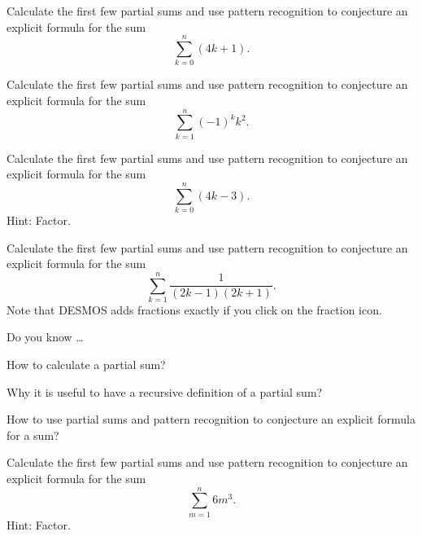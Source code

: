 \begin{exer}[\exerU] %
\label{exer_sum_conj_4kplus1}
    Calculate the first few partial sums and use pattern recognition to conjecture an explicit formula for the sum 
        $$\displaystyle \sum_{k=0}^n(4k+1).$$
    
\end{exer}

\begin{exer}[\exerU] %
\label{exer_sum_conj_alt_sq}
    Calculate the first few partial sums and use pattern recognition to conjecture an explicit formula for the sum 
        $$\sum_{k=1}^n(-1)^kk^2.$$
\end{exer}

\begin{exer}[\exerU] %
\label{exer_sum_conj_4kminus3}
    Calculate the first few partial sums and use pattern recognition to conjecture an explicit formula for the sum 
        $$\displaystyle \sum_{k=0}^n(4k-3).$$
    Hint: Factor.   
\end{exer}
 
\begin{exer}[\exerU] %
\label{exer_sum_conj_fraction}
    Calculate the first few partial sums and use pattern recognition to conjecture an explicit formula for the sum 
        $$\displaystyle \sum_{k=1}^n\frac{1}{(2k-1)(2k+1)}.$$
    Note that DESMOS adds fractions exactly if you click on the fraction icon.
\end{exer}

\begin{exer}[\exerR] %
\label{exer_dyk_sum_conj}
    Do you know \ldots
        \begin{exerpart}
            \item How to calculate a partial sum?
            \item Why it is useful to have a recursive definition of a partial sum?
            \item How to use partial sums and pattern recognition to conjecture an explicit formula for a sum?
        \end{exerpart}
\end{exer}

\begin{exer}[\exerE] %
\label{exer_sum_conj_cubes}
    Calculate the first few partial sums and use pattern recognition to conjecture an explicit formula for the sum
    $$\displaystyle \sum_{m=1}^n6m^3.$$
    Hint: Factor.
\end{exer}

